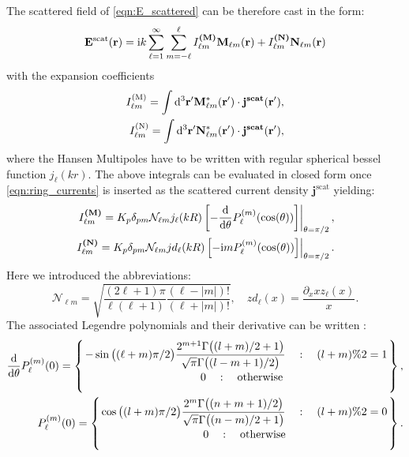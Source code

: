 The scattered field of \cref{eqn:E_scattered} can be therefore cast in the form:
\begin{equation}
\mathbf{E}^\text{scat}(\mathbf{r}) = \mathrm{i} k \sum_{\ell=1}^\infty  \sum_{m=-\ell}^\ell
I_{\ell m}^\textbf{(M)}\mathbf{M}_{\ell m}(\mathbf{r})+
I_{\ell m}^\textbf{(N)}\mathbf{N}_{\ell m}(\mathbf{r})
\label{eqn:Escat}
\end{equation}
with the expansion coefficients
\begin{align}
I_{\ell m}^\text{(M)} = \int \mathrm{d}^3\mathbf{r}' \mathbf{M}^*_{\ell m}(\mathbf{r}')\cdot
\mathbf{j}^\textbf{scat}(\mathbf{r}'),\\
I_{\ell m}^\text{(N)} = \int \mathrm{d}^3\mathbf{r}' \mathbf{N}^*_{\ell m}(\mathbf{r}')\cdot
\mathbf{j}^\textbf{scat}(\mathbf{r}'),
\end{align}
where the Hansen Multipoles have to be written with regular spherical bessel function $j_\ell(kr)$. The above integrals can be evaluated in closed form once \cref{eqn:ring_currents} is inserted as the scattered current density $\mathbf{j}^\text{scat}$ yielding:
\begin{align}
\left.I_{\ell m}^\textbf{(M)} = K_p\delta_{p m} \mathcal{N}_{\ell m} j_\ell(kR)\left[-\frac{\displaystyle\mathrm{d}}{\mathrm{d} \theta}P_{\ell}^{(m)}(\cos(\theta))
\right]\right \vert_{\theta=\pi/2},\\
\left.I_{\ell m}^\textbf{(N)} =  K_p \delta_{p m} \mathcal{N}_{\ell m}jd_\ell(kR)
\left[-\mathrm{i} m 
P_\ell^{(m)}(\cos(\theta)) \right]\right\vert_{\theta=\pi/2}.
\end{align}
Here we introduced the abbreviations:
\begin{equation}
\mathcal{N}_{\ell m} = \sqrt{\frac{(2\ell+1)\pi}{\ell(\ell+1)}\frac{(\ell-|m|)!}{(\ell+|m|)!}},\quad
zd_\ell(x) = \frac{\partial_{x}  x z_\ell(x)}{x}.
\end{equation}
The associated Legendre polynomials and their derivative can be written \Cite{Leong1997}:
\begin{align}
\frac{\rd}{\rd \theta}P_\ell^{(m)}(0) =\left\{\ontop{}{}{
-\sin\big((\ell+m)\pi/2\big)\dfrac{2^{m+1}\Gamma\big((l+m)/2+1\big)}{\sqrt{\pi}\Gamma\big((l-m+1)/2\big) }
\quad : \quad (l+m)\%2=1}{\quad0\quad: \quad\text{otherwise}}\right\},
\label{eqn:Plm0diff}
\\
P_\ell^{(m)}(0) =
\left\{
\ontop{}{}{\cos\big((l+m)\pi/2\big)\dfrac{2^m \Gamma\big((n+m+1)/2\big)}{\sqrt{\pi}\Gamma\big((n-m)/2+1\big)}\quad:\quad (l+m)\%2=0}{0\quad:\quad \text{otherwise}}\right\}.
\label{eqn:Plm0}
\end{align}
